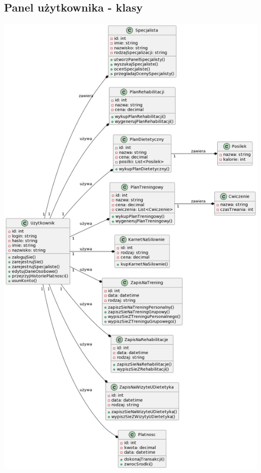 \subsection{Panel użytkownika - klasy}\label{subsec:uzytkownik}

\includegraphics{diagrams/class/uzytkownik.png}